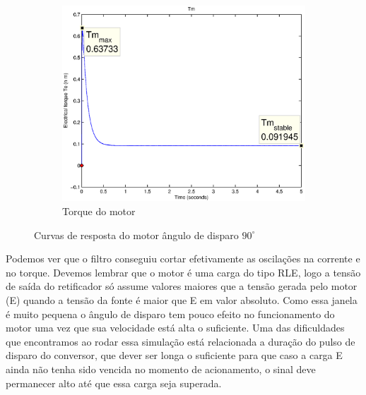 \documentclass{article}
\begin{document}
\begin{figure}[H]
\begin{subfigure}[b]{0.49\linewidth}
		\includegraphics[width=\linewidth]{matlab/tm7}
		\caption{Torque do motor}
	\end{subfigure}
	\caption{Curvas de resposta do motor ângulo de disparo $90^\circ$}
	\label{fig:res7}
\end{figure}
Podemos ver que o filtro conseguiu cortar efetivamente as oscilações na corrente e no torque. Devemos lembrar que o motor é uma carga do tipo RLE, logo a tensão de saída do retificador só assume valores maiores que a tensão gerada pelo motor (E) quando a tensão da fonte é maior que E em valor absoluto. Como essa janela é muito pequena o ângulo de disparo tem pouco efeito no funcionamento do motor uma vez que sua velocidade está alta o suficiente. Uma das dificuldades que encontramos ao rodar essa simulação está relacionada a duração do pulso de disparo do conversor, que dever ser longa o suficiente para que caso a carga E ainda não tenha sido vencida no momento de acionamento, o sinal deve permanecer alto até que essa carga seja superada.
\end{document}
